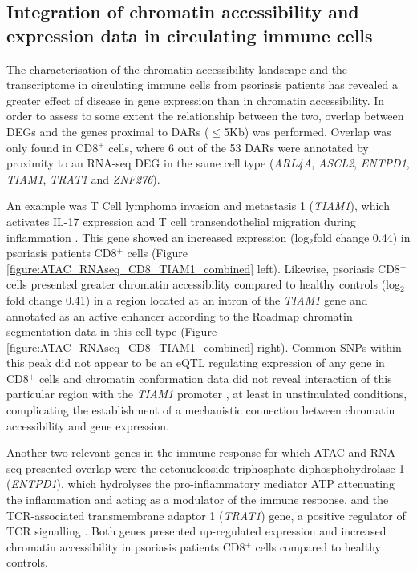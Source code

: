 \subsection{Integration of chromatin accessibility and expression data in circulating immune cells}
The characterisation of the chromatin accessibility landscape and the transcriptome in circulating immune cells from psoriasis patients has revealed a greater effect of disease in gene expression than in chromatin accessibility. In order to assess to some extent the relationship between the two, overlap between DEGs and the genes proximal to DARs ($\leq$5Kb) was performed. Overlap was only found in CD8$^+$ cells, where 6 out of the 53 DARs were annotated by proximity to an RNA-seq DEG in the same cell type (\textit{ARL4A}, \textit{ASCL2}, \textit{ENTPD1}, \textit{TIAM1}, \textit{TRAT1} and \textit{ZNF276}). 

An example was T Cell lymphoma invasion and metastasis 1 (\textit{TIAM1}), which activates IL-17 expression and T cell transendothelial migration during inflammation \parencite{Kurdi2016, Gerard2009}. This gene showed an increased expression (log$_2$fold change 0.44) in psoriasis patients CD8$^+$ cells (Figure \ref{figure:ATAC_RNAseq_CD8_TIAM1_combined} left). Likewise, psoriasis CD8$^+$ cells presented greater chromatin accessibility compared to healthy controls (log$_2$fold change 0.41) in a region located at an intron of the \textit{TIAM1} gene and annotated as an active enhancer according to the Roadmap chromatin segmentation data in this cell type (Figure \ref{figure:ATAC_RNAseq_CD8_TIAM1_combined} right). Common SNPs within this peak did not appear to be an eQTL regulating expression of any gene in CD8$^+$ cells \parencite{Kasela2017} and chromatin conformation data did not reveal interaction of this particular region with the \textit{TIAM1} promoter \parencite{Javiere2016}, at least in unstimulated conditions, complicating the establishment of a mechanistic connection between chromatin accessibility and gene expression.

Another two relevant genes in the immune response for which ATAC and RNA-seq presented overlap were the ectonucleoside triphosphate diphosphohydrolase 1 (\textit{ENTPD1}), which hydrolyses the pro-inflammatory mediator ATP attenuating the inflammation and acting as a modulator of the immune response, and the TCR-associated transmembrane adaptor 1 (\textit{TRAT1}) gene, a positive regulator of TCR signalling \parencite{Antonioli2013, Valk2006}. Both genes presented up-regulated expression and increased chromatin accessibility in psoriasis patients CD8$^+$ cells compared to healthy controls.

